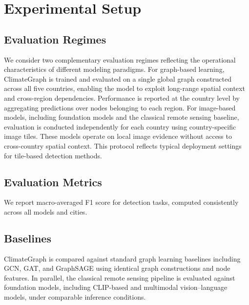 \documentclass{article}
\theoremstyle{plain}
\theoremstyle{definition}
\theoremstyle{remark}
\begin{document}


\section{Experimental Setup}

\subsection{Evaluation Regimes}
We consider two complementary evaluation regimes reflecting the operational characteristics of different modeling paradigms. For graph-based learning, ClimateGraph is trained and evaluated on a single global graph constructed across all five countries, enabling the model to exploit long-range spatial context and cross-region dependencies. Performance is reported at the country level by aggregating predictions over nodes belonging to each region. For image-based models, including foundation models and the classical remote sensing baseline, evaluation is conducted independently for each country using country-specific image tiles. These models operate on local image evidence without access to cross-country spatial context. This protocol reflects typical deployment settings for tile-based detection methods.

\subsection{Evaluation Metrics}
We report macro-averaged F1 score for detection tasks, computed consistently across all models and cities.

\subsection{Baselines}
ClimateGraph is compared against standard graph learning baselines including GCN, GAT, and GraphSAGE using identical graph constructions and node features. In parallel, the classical remote sensing pipeline is evaluated against foundation models, including CLIP-based and multimodal vision–language models, under comparable inference conditions.
\end{document}
